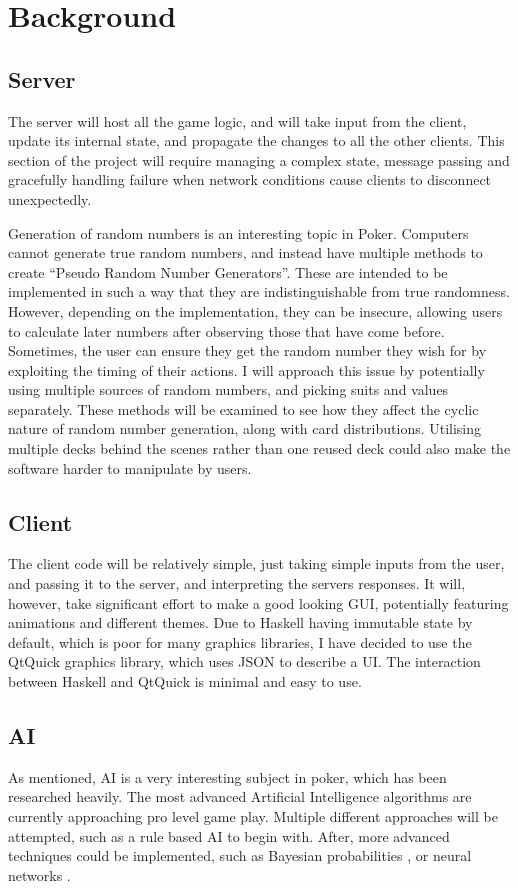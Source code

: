 \section{Background}
\subsection{Server}
The server will host all the game logic, and will take input from the client, update its internal state, and propagate the changes to all the other clients.
This section of the project will require managing a complex state, message passing and gracefully handling failure when network conditions cause clients to disconnect unexpectedly.

Generation of random numbers is an interesting topic in Poker. Computers cannot generate true random numbers, and instead have multiple methods to create ``Pseudo Random Number Generators''.
These are intended to be implemented in such a way that they are indistinguishable from true randomness.
However, depending on the implementation, they can be insecure, allowing users to calculate later numbers after observing those that have come before.
Sometimes, the user can ensure they get the random number they wish for by exploiting the timing of their actions.
I will approach this issue by potentially using multiple sources of random numbers, and picking suits and values separately. 
These methods will be examined to see how they affect the cyclic nature of random number generation, along with card distributions.
Utilising multiple decks behind the scenes rather than one reused deck could also make the software harder to manipulate by users.
\subsection{Client}
The client code will be relatively simple, just taking simple inputs from the user, and passing it to the server, and interpreting the servers responses.
It will, however, take significant effort to make a good looking GUI, potentially featuring animations and different themes.
Due to Haskell having immutable state by default, which is poor for many graphics libraries, I have decided to use the QtQuick graphics library, which uses JSON to describe a UI\@.
The interaction between Haskell and QtQuick is minimal and easy to use.
\subsection{AI}
As mentioned, AI is a very interesting subject in poker, which has been researched heavily. 
The most advanced Artificial Intelligence algorithms are currently approaching pro level game play.
Multiple different approaches will be attempted, such as a rule based AI \parencite{watson2008} to begin with.
After, more advanced techniques could be implemented, such as Bayesian probabilities \parencite{billings2002}, or neural networks \parencite{teofilo2011}.

